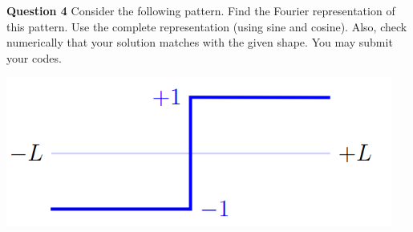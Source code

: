 \documentclass[addpoints]{exam}
\begin{document}
\begin{questions}
\begin{solution}
\end{solution}

\question \textbf{ Question 4}
Consider the following pattern. Find the Fourier representation of this pattern. Use the
complete representation (using sine and cosine). Also, check numerically that your solution
matches with the given shape. You may submit your codes.\\
\begin{center}
    \includegraphics[width = 5.0in]{q4.png}
\end{center}
\begin{solution}
 
\end{solution}

\end{questions}
\end{document}
